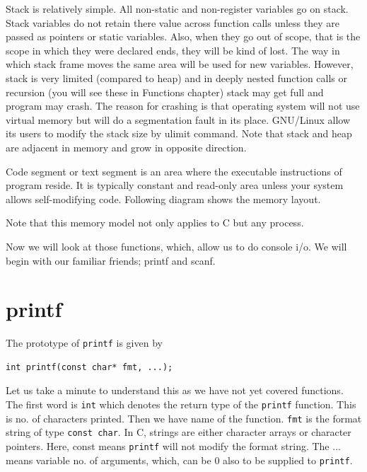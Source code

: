 Stack is relatively simple. All non-static and non-register variables go on
stack. Stack variables do not retain there value across function calls unless
they are passed as pointers or static variables. Also, when they go out of
scope, that is the scope in which they were declared ends, they will be kind of
lost. The way in which stack frame moves the same area will be used for new
variables. However, stack is very limited (compared to heap) and in deeply
nested function calls or recursion (you will see these in Functions chapter)
stack may get full and program may crash. The reason for crashing is that
operating system will not use virtual memory but will do a segmentation fault
in its place. GNU/Linux allow its users to modify the stack size by ulimit
command. Note that stack and heap are adjacent in memory and grow in opposite
direction.

Code segment or text segment is an area where the executable instructions of
program reside. It is typically constant and read-only area unless your system
allows self-modifying code. Following diagram shows the memory layout.

Note that this memory model not only applies to C but any process.

Now we will look at those functions, which, allow us to do console i/o. We will
begin with our familiar friends; printf and scanf.

\section{printf}
The prototype of \texttt{printf} is given by

\begin{verbatim}
int printf(const char* fmt, ...);
\end{verbatim}

Let us take a minute to understand this as we have not yet covered
functions. The first word is \texttt{int} which denotes the return type of the
\texttt{printf} function. This is no. of characters printed. Then we have name
of the function. \texttt{fmt} is the format string of type \texttt{const
 char}. In C, strings are either character arrays or character pointers. Here,
const means \texttt{printf} will not modify the format string. The ... means
variable no. of arguments, which, can be 0 also to be supplied to
\texttt{printf}.

